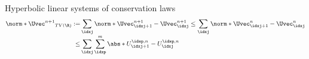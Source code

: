 \begin{defnbox}\nospacing
    \begin{defn}\label{defn:discrete_total_variation_diminishing_systems}
        Hyperbolic linear systems of conservation laws
        \begin{align}
          \norm*{\Uvec^{n+1}}_{TV(\R)}:=&\sum_{\idxj}\norm*{\Uvec_{\idxj+1}^{n+1}-\Uvec_{\idxj}^{n+1}}\leq \sum_{\idxj}\norm*{\Uvec_{\idxj+1}^{n}-\Uvec_{\idxj}^{n}}\nonumber\\[-1\jot]
          \label{eq:discrete_total_variation_diminishing_systems}
          \leq&\sum_{\idxj}\sum_{\idxp}^{m}\abs*{U_{\idxj+1}^{\idxp,n}-U_{\idxj}^{\idxp,n}}
        \end{align}
    \end{defn}
\end{defnbox}

